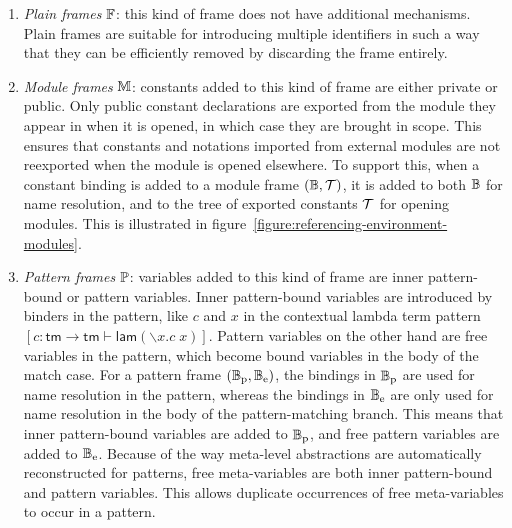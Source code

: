 \begin{enumerate}
\item
\textit{Plain frames} $\mathbb{F}$: this kind of frame does not have additional mechanisms.
Plain frames are suitable for introducing multiple identifiers in such a way that they can be efficiently removed by discarding the frame entirely.
\item
\textit{Module frames} $\mathbb{M}$: constants added to this kind of frame are either private or public.
Only public constant declarations are exported from the module they appear in when it is opened, in which case they are brought in scope.
This ensures that constants and notations imported from external modules are not reexported when the module is opened elsewhere.
To support this, when a constant binding is added to a module frame $(\mathbb{B}, \mathcal{T})$, it is added to both $\mathbb{B}$ for name resolution, and to the tree of exported constants $\mathcal{T}$ for opening modules.
This is illustrated in figure~\ref{figure:referencing-environment-modules}.
\item
\textit{Pattern frames} $\mathbb{P}$: variables added to this kind of frame are inner pattern-bound or pattern variables.
Inner pattern-bound variables are introduced by binders in the pattern, like $c$ and $x$ in the contextual lambda term pattern $[c : \mathsf{tm} \rightarrow \mathsf{tm} \vdash \mathsf{lam} (\backslash x. c\; x)]$.
Pattern variables on the other hand are free variables in the pattern, which become bound variables in the body of the match case.
For a pattern frame $(\mathbb{B}_{\text{p}}, \mathbb{B}_{\text{e}})$, the bindings in $\mathbb{B}_{\text{p}}$ are used for name resolution in the pattern, whereas the bindings in $\mathbb{B}_{\text{e}}$ are only used for name resolution in the body of the pattern-matching branch.
This means that inner pattern-bound variables are added to $\mathbb{B}_{\text{p}}$, and free pattern variables are added to $\mathbb{B}_{\text{e}}$.
Because of the way meta-level abstractions are automatically reconstructed for patterns, free meta-variables are both inner pattern-bound and pattern variables.
This allows duplicate occurrences of free meta-variables to occur in a pattern.
\end{enumerate}

